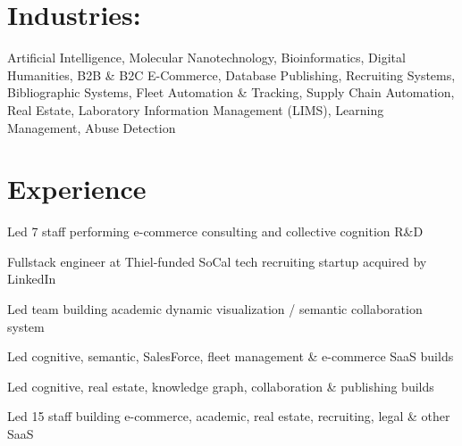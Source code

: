 \documentclass[line,margin,hidelinks]{res}
\begin{document}
\begin{resume}
\section{Industries:}
\begin{par}
Artificial Intelligence,
Molecular Nanotechnology,
Bioinformatics,
Digital Humanities,
B2B \& B2C E-Commerce,
Database Publishing,
Recruiting Systems,
Bibliographic Systems,
Fleet Automation \& Tracking,
Supply Chain Automation,
Real Estate,
Laboratory Information Management (LIMS),
Learning Management,
Abuse Detection
\end{par}


\section{Experience}


\begin{position}
Led 7 staff performing e-commerce consulting and collective cognition R\&D
\end{position}

\parskip=3.5pt %


\begin{position}
Fullstack engineer at Thiel-funded SoCal tech recruiting startup acquired by LinkedIn
\end{position}


\begin{position}
Led team building academic dynamic visualization / semantic collaboration system
\end{position}


\begin{position}
Led cognitive, semantic, SalesForce, fleet management \& e-commerce SaaS builds
\end{position}


\begin{position}
Led cognitive, real estate, knowledge graph, collaboration \& publishing builds
\end{position}


\begin{position}
Led 15 staff building e-commerce, academic, real estate, recruiting, legal \& other SaaS
\end{position}


\end{resume}
\end{document}
